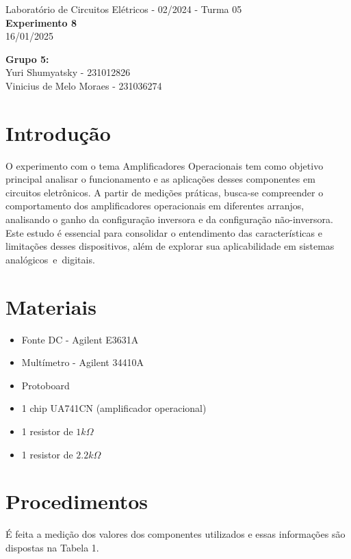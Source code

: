 \documentclass[a4 paper]{article}
\newcommand{\parag}{\hspace{30pt}}
\begin{document}
\justifying
\begin{center}{\large Laboratório de Circuitos Elétricos - 02/2024 - Turma 05}\\
{\large \textbf{Experimento 8}}\\ 
16/01/2025
\end{center}

\vspace{500pt}
 \noindent\textbf{Grupo 5:}\\
 Yuri Shumyatsky - 231012826\\
Vinicius de Melo Moraes - 231036274\\



\vspace{30pt}
\newpage

\section{Introdução}

\parag O experimento com o tema Amplificadores Operacionais tem como objetivo principal analisar o funcionamento e as aplicações desses componentes em circuitos eletrônicos. A partir de medições práticas, busca-se compreender o comportamento dos amplificadores operacionais em diferentes arranjos, analisando o ganho da configuração inversora e da configuração não-inversora. Este estudo é essencial para consolidar o entendimento das características e limitações desses dispositivos, além de explorar sua aplicabilidade em sistemas analógicos e digitais.

\section{Materiais}
	\begin{itemize}
	\item Fonte DC - Agilent E3631A
	\item Multímetro - Agilent 34410A
	\item Protoboard
	\item 1 chip UA741CN (amplificador operacional)
	\item 1 resistor de $1k\Omega$
	\item 1 resistor de $2.2k\Omega$
	\end{itemize}

\newpage

\section{Procedimentos}
\parag É feita a medição dos valores dos componentes utilizados e essas informações são dispostas na Tabela 1.
\end{document}
